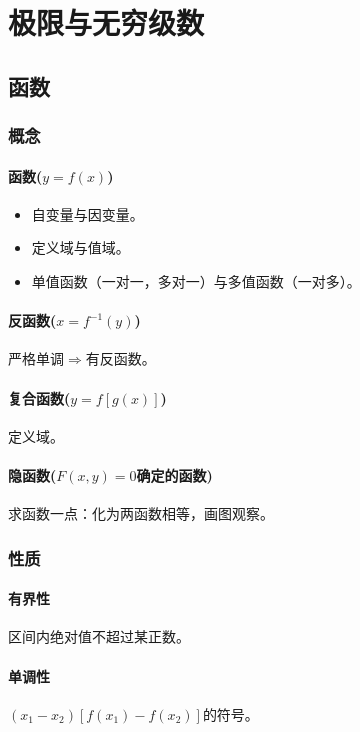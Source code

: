 \documentclass[
12pt, %
a4paper, 
oneside, %
headinclude,footinclude, %
]{scrartcl}
\begin{document}
\section{极限与无穷级数}
\subsection{函数}
\subsubsection{概念}
\paragraph{函数($ y = f(x) $)}
\begin{itemize}
\item 自变量与因变量。
\item 定义域与值域。
\item 单值函数（一对一，多对一）与多值函数（一对多）。
\end{itemize}
\paragraph{反函数($ x = f^{-1}(y) $)}
严格单调$ \Rightarrow $有反函数。
\paragraph{复合函数($ y = f[g(x)] $)}
定义域。
\paragraph{隐函数($ F(x,y) = 0 $确定的函数)}
求函数一点：化为两函数相等，画图观察。
\subsubsection{性质}
\paragraph{有界性}
区间内绝对值不超过某正数。
\paragraph{单调性}
$ (x_1 - x_2)[f(x_1) - f(x_2)] $的符号。
\end{document}
